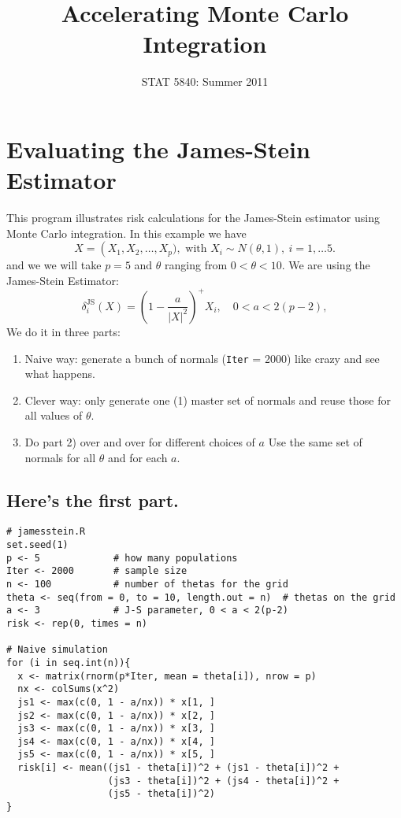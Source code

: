 \documentclass[11pt,english]{article}
\title{Accelerating Monte Carlo Integration}
\date{STAT 5840: Summer 2011}
\begin{document}
\maketitle

\thispagestyle{empty}

\section*{Evaluating the James-Stein Estimator}
\label{sec-1}

This program illustrates risk calculations for the James-Stein estimator using Monte Carlo integration.  In this example we have 
\[
X = \left( X_{1},X_{2},\ldots,X_{p}),\mbox{ with }X_{i}\sim N(\theta,1),\ i=1,\ldots 5. 
\]
and we we will take $p = 5$ and $\theta$ ranging from $0 < \theta < 10$. We are using the James-Stein Estimator:
\[
\delta_{i}^{\mathrm{JS}}(X) = \left(1 - \frac{a}{|X|^{2}} \right)^{+} X_{i}, \quad 0 < a < 2(p - 2),
\]
 We do it in three parts:

\begin{enumerate}
\item Naive way: generate a bunch of normals (\texttt{Iter} = 2000) like crazy and see what happens.
\item Clever way: only generate one (1) master set of normals and reuse those for all values of $\theta$.
\item Do part 2) over and over for different choices of $a$  Use the same set of normals for all $\theta$ and for each $a$.
\end{enumerate}
\subsection*{Here's the first part.}
\label{sec-1-1}



\begin{verbatim}
# jamesstein.R
set.seed(1)
p <- 5             # how many populations
Iter <- 2000       # sample size
n <- 100           # number of thetas for the grid
theta <- seq(from = 0, to = 10, length.out = n)  # thetas on the grid
a <- 3             # J-S parameter, 0 < a < 2(p-2)
risk <- rep(0, times = n)

# Naive simulation
for (i in seq.int(n)){
  x <- matrix(rnorm(p*Iter, mean = theta[i]), nrow = p)
  nx <- colSums(x^2)
  js1 <- max(c(0, 1 - a/nx)) * x[1, ]
  js2 <- max(c(0, 1 - a/nx)) * x[2, ]
  js3 <- max(c(0, 1 - a/nx)) * x[3, ]
  js4 <- max(c(0, 1 - a/nx)) * x[4, ]
  js5 <- max(c(0, 1 - a/nx)) * x[5, ]
  risk[i] <- mean((js1 - theta[i])^2 + (js1 - theta[i])^2 + 
                  (js3 - theta[i])^2 + (js4 - theta[i])^2 + 
                  (js5 - theta[i])^2)
}
\end{verbatim}
\end{document}

